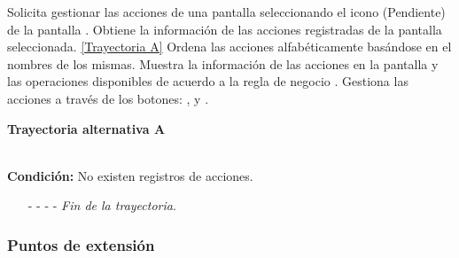 \begin{UCtrayectoria}
	\UCpaso[\UCactor] Solicita gestionar las acciones de una pantalla seleccionando el icono (Pendiente) de la pantalla .
	\UCpaso[\UCsist] Obtiene la información de las acciones registradas de la pantalla seleccionada. \hyperlink{CU11-1-1:TAA}{[Trayectoria A]}
	\UCpaso[\UCsist] Ordena las acciones alfabéticamente basándose en el nombres de los mismas.
	\UCpaso[\UCsist] Muestra la información de las acciones en la pantalla  y las operaciones disponibles de acuerdo a la regla de negocio . \label{CU11-1-1-P4}
	\UCpaso[\UCactor] Gestiona las acciones a través de los botones: , \editar y \eliminar. 
\end{UCtrayectoria}		
\hypertarget{CU11-1-1:TAA}{\textbf{Trayectoria alternativa A}}\\
\noindent \textbf{Condición:} No existen registros de acciones.
\begin{enumerate}
	\UCpaso[\UCsist] Muestra el mensaje  en la pantalla  para indicar que no hay registros de acciones para mostrar.  \label{CU11-1-1-TA1}
	\UCpaso[\UCactor] Gestiona las acciones a través del botón: . 
	\item[- -] - - {\em {Fin de la trayectoria}}.%
\end{enumerate}
\subsubsection{Puntos de extensión}

